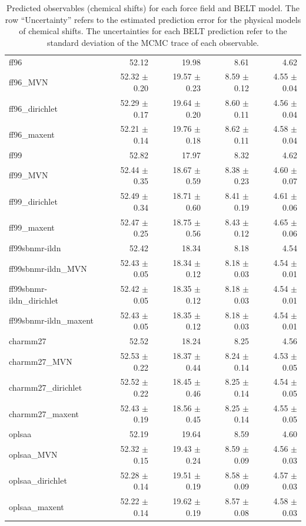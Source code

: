 \documentclass[12pt]{article}
\begin{document}
\begin{table}
\begin{tabular}{lrrrr}
\toprule
ff96                      & 52.12   & 19.98  & 8.61  & 4.62  \\
ff96\_MVN                 & 52.32 $\pm$ 0.20 & 19.57 $\pm$ 0.23 & 8.59 $\pm$ 0.12 & 4.55 $\pm$ 0.04 \\
ff96\_dirichlet           & 52.29 $\pm$ 0.17 & 19.64 $\pm$ 0.20 & 8.60 $\pm$ 0.11 & 4.56 $\pm$ 0.04 \\
ff96\_maxent              & 52.21 $\pm$ 0.14 & 19.76 $\pm$ 0.18 & 8.62 $\pm$ 0.11 & 4.58 $\pm$ 0.04 \\
\toprule
ff99                     & 52.82 & 17.97 & 8.32 & 4.62 \\
ff99\_MVN                 & 52.44 $\pm$ 0.35 & 18.67 $\pm$ 0.59 & 8.38 $\pm$ 0.23 & 4.60 $\pm$ 0.07 \\
ff99\_dirichlet           & 52.49 $\pm$ 0.34 & 18.71 $\pm$ 0.60 & 8.41 $\pm$ 0.19 & 4.61 $\pm$ 0.06 \\
ff99\_maxent              & 52.47 $\pm$ 0.25 & 18.75 $\pm$ 0.56 & 8.43 $\pm$ 0.12 & 4.65 $\pm$ 0.06 \\
\toprule
ff99sbnmr-ildn           & 52.42 & 18.34 & 8.18 & 4.54 \\
ff99sbnmr-ildn\_MVN       & 52.43 $\pm$ 0.05 & 18.34 $\pm$ 0.12 & 8.18 $\pm$ 0.03 & 4.54 $\pm$ 0.01 \\
ff99sbnmr-ildn\_dirichlet & 52.42 $\pm$ 0.05 & 18.35 $\pm$ 0.12 & 8.18 $\pm$ 0.03 & 4.54 $\pm$ 0.01 \\
ff99sbnmr-ildn\_maxent    & 52.43 $\pm$ 0.05 & 18.35 $\pm$ 0.12 & 8.18 $\pm$ 0.03 & 4.54 $\pm$ 0.01 \\
\toprule
charmm27                    & 52.52 & 18.24 & 8.25 & 4.56 \\
charmm27\_MVN             & 52.53 $\pm$ 0.22 & 18.37 $\pm$ 0.44 & 8.24 $\pm$ 0.14 & 4.53 $\pm$ 0.05 \\
charmm27\_dirichlet       & 52.52 $\pm$ 0.22 & 18.45 $\pm$ 0.46 & 8.25 $\pm$ 0.14 & 4.54 $\pm$ 0.05 \\
charmm27\_maxent          & 52.43 $\pm$ 0.19 & 18.56 $\pm$ 0.45 & 8.25 $\pm$ 0.14 & 4.55 $\pm$ 0.05 \\
\toprule
oplsaa                      & 52.19 & 19.64 & 8.59 & 4.60 \\
oplsaa\_MVN               & 52.32 $\pm$ 0.15 & 19.43 $\pm$ 0.24 & 8.59 $\pm$ 0.09 & 4.56 $\pm$ 0.03 \\
oplsaa\_dirichlet         & 52.28 $\pm$ 0.14 & 19.51 $\pm$ 0.19 & 8.58 $\pm$ 0.09 & 4.57 $\pm$ 0.03 \\
oplsaa\_maxent            & 52.22 $\pm$ 0.14 & 19.62 $\pm$ 0.19 & 8.57 $\pm$ 0.08 & 4.58 $\pm$ 0.03\\
\bottomrule
\end{tabular}

\caption{
Predicted observables (chemical shifts) for each force field and BELT model.  The row ``Uncertainty'' refers to the estimated prediction error for the physical models of chemical shifts.  The uncertainties for each BELT prediction refer to the standard deviation of the MCMC trace of each observable.  
}
\end{table}
\newpage
\end{document}
